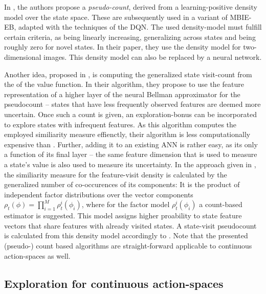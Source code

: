 In \cite{bellemare_unifying_2016}, the authors propose a \textit{pseudo-count}, derived from a learning-positive density model over the state space. These are subsequently used in a variant of MBIE-EB, adapted with the techniques of the DQN. The used density-model must fulfill certain criteria, as being linearly increasing, generalizing across states and being roughly zero for novel states. In their paper, they use the  density model for two-dimensional images. This density model can also be replaced by a neural network.

Another idea, proposed in \cite{martin_count-based_2017}, is computing the generalized state visit-count from the  of the value function. In their algorithm, they propose to use the feature representation of a higher layer of the neural Bellman approximator for the pseudocount -- states that have less frequently observed features are deemed more uncertain. Once such a count is given, an exploration-bonus can be incorporated to explore states with infrequent features. As this algorithm computes the employed similiarity measure effienctly, their algorithm is less computationally expensive than \cite{bellemare_unifying_2016}. Further, adding it to an existing ANN is rather easy, as its only a function of its final layer -- the same feature dimension that is used to measure a state's value is also used to measure its uncertainty. In the approach given in \cite{martin_count-based_2017}, the similiarity measure for the feature-visit density is calculated by the generalized number of co-occurences of its components: It is the product of independent factor distributions over the vector components $\rho_t(\phi) = \prod_{i=1}^{M}\rho_t^i(\phi_i)$, where for the factor model $\rho_t^i(\phi_i)$ a count-based estimator is suggested. This model assigns higher proability to state feature vectors that share features with already visited states. A state-visit pseudocount is calculated from this density model accordingly to \cite{bellemare_unifying_2016}. 
Note that the presented (pseudo-) count based algorithms are straight-forward applicable to continuous action-spaces as well.


\subsection{Exploration for continuous action-spaces}

